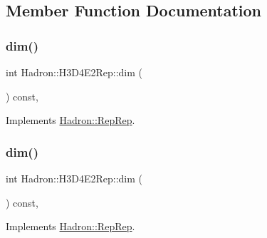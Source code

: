 \subsection{Member Function Documentation}
\mbox{\label{structHadron_1_1H3D4E2Rep_ae4a78fda385ad21cf43f989f5b3aec5f}} 
\subsubsection{\texorpdfstring{dim()}{dim()}\hspace{0.1cm}{\footnotesize\ttfamily [1/5]}}
{\footnotesize\ttfamily int Hadron\+::\+H3\+D4\+E2\+Rep\+::dim (\begin{DoxyParamCaption}{ }\end{DoxyParamCaption}) const\hspace{0.3cm}{\ttfamily [inline]}, {\ttfamily [virtual]}}



Implements \mbox{\hyperlink{structHadron_1_1RepRep_a92c8802e5ed7afd7da43ccfd5b7cd92b}{Hadron\+::\+Rep\+Rep}}.

\mbox{\label{structHadron_1_1H3D4E2Rep_ae4a78fda385ad21cf43f989f5b3aec5f}} 
\subsubsection{\texorpdfstring{dim()}{dim()}\hspace{0.1cm}{\footnotesize\ttfamily [2/5]}}
{\footnotesize\ttfamily int Hadron\+::\+H3\+D4\+E2\+Rep\+::dim (\begin{DoxyParamCaption}{ }\end{DoxyParamCaption}) const\hspace{0.3cm}{\ttfamily [inline]}, {\ttfamily [virtual]}}



Implements \mbox{\hyperlink{structHadron_1_1RepRep_a92c8802e5ed7afd7da43ccfd5b7cd92b}{Hadron\+::\+Rep\+Rep}}.

\mbox{\label{structHadron_1_1H3D4E2Rep_ae4a78fda385ad21cf43f989f5b3aec5f}} 
